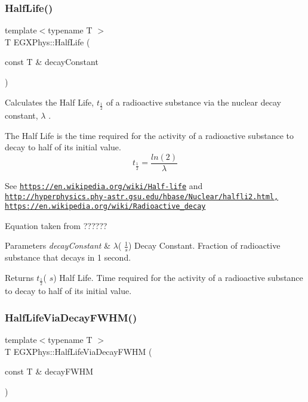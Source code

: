\subsubsection{\texorpdfstring{Half\+Life()}{HalfLife()}}
{\footnotesize\ttfamily template$<$typename T $>$ \\
T E\+G\+X\+Phys\+::\+Half\+Life (\begin{DoxyParamCaption}\item[{const T \&}]{decay\+Constant }\end{DoxyParamCaption})}



Calculates the Half Life, $t_{\frac{1}{2}}$ of a radioactive substance via the nuclear decay constant, $\lambda$ . 

The Half Life is the time required for the activity of a radioactive substance to decay to half of its initial value. \[t_{\frac{1}{2}}=\frac{ln(2)}{\lambda}\]

See \href{https://en.wikipedia.org/wiki/Half-life}{\tt https\+://en.\+wikipedia.\+org/wiki/\+Half-\/life} and \href{http://hyperphysics.phy-astr.gsu.edu/hbase/Nuclear/halfli2.html,}{\tt http\+://hyperphysics.\+phy-\/astr.\+gsu.\+edu/hbase/\+Nuclear/halfli2.\+html,} \href{https://en.wikipedia.org/wiki/Radioactive_decay}{\tt https\+://en.\+wikipedia.\+org/wiki/\+Radioactive\+\_\+decay}

Equation taken from ??????


\begin{DoxyParams}{Parameters}
{\em decay\+Constant} & $\lambda$( $\frac{1}{s}$) Decay Constant. Fraction of radioactive substance that decays in 1 second. \\
\hline
\end{DoxyParams}
\begin{DoxyReturn}{Returns}
$t_{\frac{1}{2}}$( $s$) Half Life. Time required for the activity of a radioactive substance to decay to half of its initial value. 
\end{DoxyReturn}
\mbox{\label{group___atomic_ga705a1fd3584a6d196676743024053fb8}} 
\subsubsection{\texorpdfstring{Half\+Life\+Via\+Decay\+F\+W\+H\+M()}{HalfLifeViaDecayFWHM()}}
{\footnotesize\ttfamily template$<$typename T $>$ \\
T E\+G\+X\+Phys\+::\+Half\+Life\+Via\+Decay\+F\+W\+HM (\begin{DoxyParamCaption}\item[{const T \&}]{decay\+F\+W\+HM }\end{DoxyParamCaption})}




